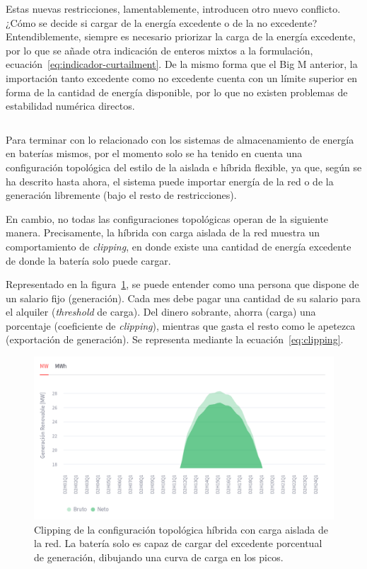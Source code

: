 \begin{equation}
  \label{eq:uncurtailed-import}
\end{equation}

Estas nuevas restricciones, lamentablemente, introducen otro nuevo conflicto. ¿Cómo se decide si cargar de la energía excedente o de la no excedente? Entendiblemente, siempre es necesario priorizar la carga de la energía excedente, por lo que se añade otra indicación de enteros mixtos a la formulación, ecuación~\ref{eq:indicador-curtailment}. De la mismo forma que el Big M anterior, la importación tanto excedente como no excedente cuenta con un límite superior en forma de la cantidad de energía disponible, por lo que no existen problemas de estabilidad numérica directos.

\begin{equation}
  \label{eq:indicador-curtailment}
\end{equation}

Para terminar con lo relacionado con los sistemas de almacenamiento de energía en baterías mismos, por el momento solo se ha tenido en cuenta una configuración topológica del estilo de la aislada e híbrida flexible, ya que, según se ha descrito hasta ahora, el sistema puede importar energía de la red o de la generación libremente (bajo el resto de restricciones).

En cambio, no todas las configuraciones topológicas operan de la siguiente manera. Precisamente, la híbrida con carga aislada de la red muestra un comportamiento de \textit{clipping}, en donde existe una cantidad de energía excedente de donde la batería solo puede cargar.

Representado en la figura~\ref{fig:clipping}, se puede entender como una persona que dispone de un salario fijo (generación). Cada mes debe pagar una cantidad de su salario para el alquiler (\textit{threshold} de carga). Del dinero sobrante, ahorra (carga) una porcentaje (coeficiente de \textit{clipping}), mientras que gasta el resto como le apetezca (exportación de generación). Se representa mediante la ecuación~\ref{eq:clipping}.

\begin{figure}
  \centering
  \includegraphics[width=0.75\linewidth]{figures/clipping.png}
  \caption[Clipping de configuración topológica híbrida.]{Clipping de la configuración topológica híbrida con carga aislada de la red. La batería solo es capaz de cargar del excedente porcentual de generación, dibujando una curva de carga en los picos.}
  \label{fig:clipping}
\end{figure}

